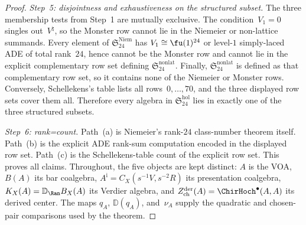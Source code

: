 \begin{proof}
\emph{Step~5: disjointness and exhaustiveness on the structured subset.}
The three membership tests from Step~1 are mutually exclusive.
The condition~$V_1=0$ singles out~$V^\natural$, so the Monster row
cannot lie in the Niemeier or non-lattice summands. Every element of
$\mathfrak{S}_{24}^{\mathrm{Niem}}$ has
$V_1\cong \fu(1)^{24}$ or level-$1$ simply-laced ADE of total
rank~$24$, hence cannot be the Monster row and cannot lie in the
explicit complementary row set defining
$\mathfrak{S}_{24}^{\mathrm{nonlat}}$. Finally,
$\mathfrak{S}_{24}^{\mathrm{nonlat}}$ is defined as that complementary
row set, so it contains none of the Niemeier or Monster rows.
Conversely, Schellekens's table lists all rows~$0,\dots,70$, and the
three displayed row sets cover them all. Therefore every algebra in
$\mathfrak{S}_{24}^{\mathrm{hol}}$ lies in exactly one of the three
structured subsets.

\emph{Step~6: rank=count.}
Path~(a) is Niemeier's rank-$24$ class-number theorem itself. Path~(b)
is the explicit ADE rank-sum computation encoded in the displayed row
set. Path~(c) is the Schellekens-table count of the explicit row set.
This proves all claims. Throughout, the five objects are kept distinct:
$A$ is the VOA, $B(A)$ its bar coalgebra,
$A^{\mathrm i}=C_X(s^{-1}V,s^{-2}R)$ its presentation coalgebra,
$K_X(A)=\mathbb D_{\Ran}B_X(A)$ its Verdier algebra, and
$Z^{\mathrm{der}}_{\mathrm{ch}}(A)=\ChirHoch^\bullet(A,A)$ its derived
center. The maps $q_A$, $\mathbb D(q_A)$, and~$\nu_A$ supply the
quadratic and chosen-pair comparisons used by the theorem.
\end{proof}

